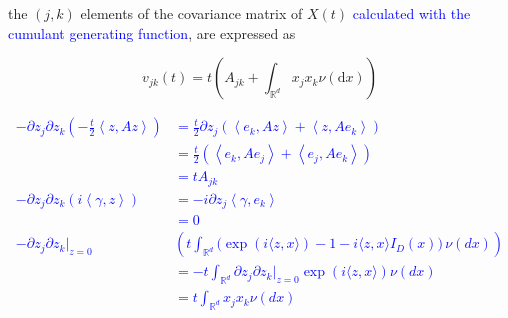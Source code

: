 \documentclass[a4paper,11pt]{article}
\begin{document}
the $(j, k)$ elements of the covariance matrix of $X(t)$ \textcolor{blue}{calculated with the cumulant generating function}, are expressed as


\begin{equation*}
    v_{j k}(t)=t\left(A_{j k}+\int_{\mathbb{R}^{d}} x_{j} x_{k} \nu(\mathrm{d} x)\right) \tag{25.8}
\end{equation*}

\textcolor{blue}{
    \begin{align*}
        -\partial z_{j} \partial z_{k} \left( -\frac{t}{2} \left< z,Az \right> \right) & =
        \frac{t}{2}\partial z_{j} \left( \left<e_{k}, Az \right> + \left<z , Ae_{k} \right>  \right)                                                                                                                                            \\
                                                                                       & = \frac{t}{2} \left( \left<e_{k}, Ae_{j} \right> + \left<e_{j} , Ae_{k} \right>  \right)                                                               \\
                                                                                       & = tA_{jk}                                                                                                                                              \\
        -\partial z_{j} \partial z_{k} \left(  i\left< \gamma,z \right> \right)        & = -i \partial z_{j} \left< \gamma, e_{k} \right>                                                                                                       \\
                                                                                       & = 0                                                                                                                                                    \\
        -\partial z_{j} \partial z_{k}|_{z=0}                                          & \left(t \int_{\mathbb{R}^{d}} \bigl( \operatorname{e x p} ( i \langle z, x \rangle)-1-i \langle z, x \rangle I_{D} ( x ) \bigr) \, \nu( d x )  \right) \\
                                                                                       & = -t\int_{\mathbb{R}^{d}}  \partial z_{j} \partial z_{k} |_{z=0}\operatorname{e x p} ( i \langle z, x \rangle) \nu( d x )                              \\
                                                                                       & = t\int_{\mathbb{R}^{d}} x_{j} x_{k} \nu( d x )
    \end{align*}
}
\end{document}
